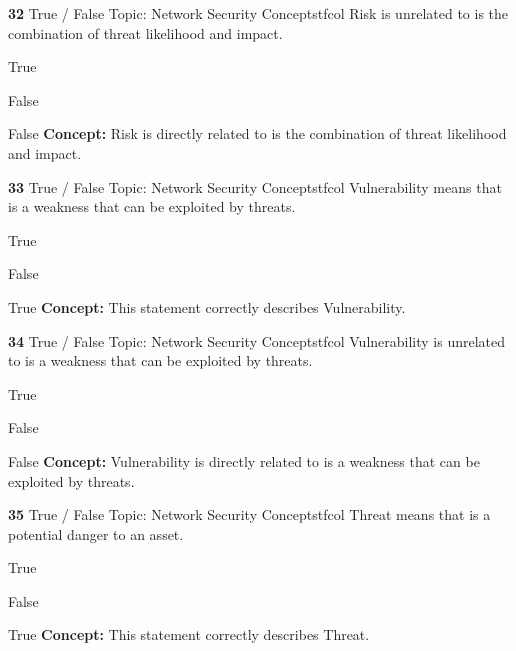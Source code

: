 \documentclass[10pt,a4paper]{article}
\begin{document}
\begin{qcard}{\color{white}\textbf{32} \hfill \small True / False \textbar{} Topic: Network Security Concepts}{tfcol}
Risk is unrelated to is the combination of threat likelihood and impact.

\begin{qoptions}
\item True
\item False
\end{qoptions}
\begin{explainbox}{False}
\textbf{Concept:} Risk is directly related to is the combination of threat likelihood and impact.
\end{explainbox}
\end{qcard}

\begin{qcard}{\color{white}\textbf{33} \hfill \small True / False \textbar{} Topic: Network Security Concepts}{tfcol}
Vulnerability means that is a weakness that can be exploited by threats.

\begin{qoptions}
\item True
\item False
\end{qoptions}
\begin{explainbox}{True}
\textbf{Concept:} This statement correctly describes Vulnerability.
\end{explainbox}
\end{qcard}

\begin{qcard}{\color{white}\textbf{34} \hfill \small True / False \textbar{} Topic: Network Security Concepts}{tfcol}
Vulnerability is unrelated to is a weakness that can be exploited by threats.

\begin{qoptions}
\item True
\item False
\end{qoptions}
\begin{explainbox}{False}
\textbf{Concept:} Vulnerability is directly related to is a weakness that can be exploited by threats.
\end{explainbox}
\end{qcard}

\begin{qcard}{\color{white}\textbf{35} \hfill \small True / False \textbar{} Topic: Network Security Concepts}{tfcol}
Threat means that is a potential danger to an asset.

\begin{qoptions}
\item True
\item False
\end{qoptions}
\begin{explainbox}{True}
\textbf{Concept:} This statement correctly describes Threat.
\end{explainbox}
\end{qcard}
\end{document}
